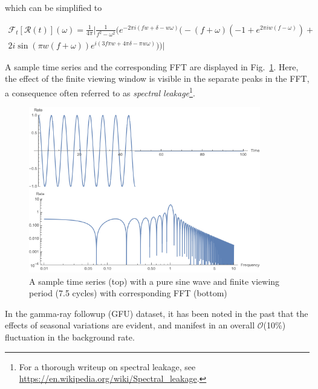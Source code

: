 which can be simplified to 

\begin{multline}
    \mathcal{F}_t[\mathcal{R}(t)](\omega ) = \frac{1}{4\pi} \Big| \frac{1}{f^2 - \omega^2} \Big( e^{- 2 \pi i (fw+\delta-w\omega)}\big(-(f+\omega)(-1+e^{2\pi i w(f-\omega)}) + \\ 2i\sin (\pi w(f + \omega)) e^{i(3f\pi w + 4\pi \delta - \pi w \omega)}\big) \Big) \Big|
\end{multline}

A sample time series and the corresponding FFT are displayed in Fig.~\ref{fig:ex_fft}. Here, the effect of the finite viewing window is visible in the separate peaks in the FFT, a consequence often referred to as \textit{spectral leakage}\footnote{For a thorough writeup on spectral leakage, see \url{https://en.wikipedia.org/wiki/Spectral_leakage}.}.
\begin{figure}
    \centering
    \includegraphics[width=0.90\textwidth]{images/box_fft_sample.png}
    \caption{A sample time series (top) with a pure sine wave and finite viewing period (7.5 cycles) with corresponding FFT (bottom)}
    \label{fig:ex_fft}
\end{figure}
In the gamma-ray followup (GFU) dataset, it has been noted in the past that the effects of seasonal variations are evident, and manifest in an overall $\mathcal{O}$(10\%) fluctuation in the background rate. 

